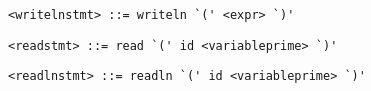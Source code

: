 \begin{footnotesize}
\begin{lstlisting}[frame=single, label={writelnstmt}, language=pie]
<writelnstmt> ::= writeln `(' <expr> `)'
\end{lstlisting}

\begin{lstlisting}[frame=single, label={readstmt}, language=pie]
<readstmt> ::= read `(' id <variableprime> `)'
\end{lstlisting}

\begin{lstlisting}[frame=single, label={readlnstmt}, language=pie]
<readlnstmt> ::= readln `(' id <variableprime> `)'
\end{lstlisting}
\end{footnotesize}
